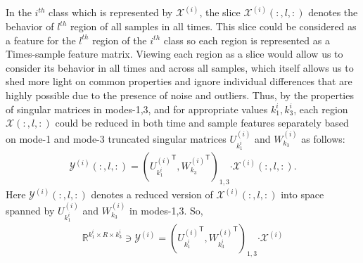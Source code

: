 \documentclass[journal]{IEEEtran}
\newcommand{\trans}{\mathsf{T}}
\begin{document}
	
	In the $i^{th}$ class which is represented by $\mathcal{X}^{(i)}$, the slice $\mathcal{X}^{(i)}(:,l,:)$ denotes
	the  behavior of $l^{th}$  region of all samples in all times.    
	This slice could be considered as a feature for the $l^{th}$ region of the $i^{th}$ class so each region is represented as a  Times-sample feature matrix. Viewing each region as a slice would allow us to consider its behavior in all times and across all samples, which itself allows us to shed more light on common properties and ignore individual differences that are highly possible due to the presence of noise and outliers.
	Thus, by the properties of singular matrices in modes-1,3, and for appropriate values
	$k_1^i,k_3^i$, each region $\mathcal{X}(:,l,:)$ could be reduced in both time and sample features separately
	based on mode-1 and mode-3 truncated singular matrices $U_{k_1^i}^{(i)}$ and $W_{k_3}^{(i)}$
	as follows: 
	\begin{eqnarray}
	\mathcal{Y}^{(i)}(:,l,:) = \left( 
	{U_{k_1^i}^{(i)}}^{\trans},  {W_{k_3}^{(i)}}^{\trans} 
	\right)_{1,3} \boldsymbol{\cdot} \mathcal{X}^{(i)}(:,l,:).
	\end{eqnarray}
	Here $\mathcal{Y}^{(i)}(:,l,:)$  denotes a reduced version of $\mathcal{X}^{(i)}(:,l,:)$ into space
	spanned by $U_{k_1^i}^{(i)}$ and $W_{k_3}^{(i)}$ in modes-1,3. So,
	\begin{align}
	\mathbb{R}^{k_1^i \times R \times k_3^i} \ni  {{\mathcal{Y}^{(i)}}} = \left( 
	{U_{k_1^i}^{(i)}}^{\trans}, {W_{k^i_3}^{(i)}}^{\trans} 
	\right)_{1,3}\boldsymbol{\cdot} \mathcal{X}^{(i)} \label{DR_Version_FC1}
	\end{align} 
\end{document}
